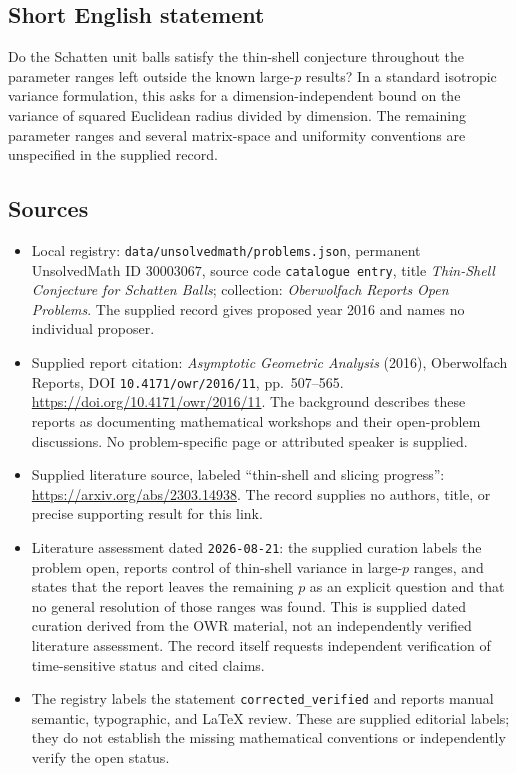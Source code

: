 \documentclass[11pt]{article}
\begin{document}
\subsection{Short English statement}
Do the Schatten unit balls satisfy the thin-shell conjecture throughout the parameter ranges left outside the known large-\(p\) results? In a standard isotropic variance formulation, this asks for a dimension-independent bound on the variance of squared Euclidean radius divided by dimension. The remaining parameter ranges and several matrix-space and uniformity conventions are unspecified in the supplied record.
\subsection{Sources}
\begin{itemize}
\item Local registry: \texttt{data/unsolvedmath/problems.json}, permanent UnsolvedMath ID \(30003067\), source code \texttt{catalogue entry}, title \emph{Thin-Shell Conjecture for Schatten Balls}; collection: \emph{Oberwolfach Reports Open Problems}. The supplied record gives proposed year 2016 and names no individual proposer.
\item Supplied report citation: \emph{Asymptotic Geometric Analysis} (2016), Oberwolfach Reports, DOI \texttt{10.4171/owr/2016/11}, pp.~507--565. \url{https://doi.org/10.4171/owr/2016/11}. The background describes these reports as documenting mathematical workshops and their open-problem discussions. No problem-specific page or attributed speaker is supplied.
\item Supplied literature source, labeled ``thin-shell and slicing progress'': \url{https://arxiv.org/abs/2303.14938}. The record supplies no authors, title, or precise supporting result for this link.
\item Literature assessment dated \texttt{2026-08-21}: the supplied curation labels the problem open, reports control of thin-shell variance in large-\(p\) ranges, and states that the report leaves the remaining \(p\) as an explicit question and that no general resolution of those ranges was found. This is supplied dated curation derived from the OWR material, not an independently verified literature assessment. The record itself requests independent verification of time-sensitive status and cited claims.
\item The registry labels the statement \texttt{corrected\_verified} and reports manual semantic, typographic, and LaTeX review. These are supplied editorial labels; they do not establish the missing mathematical conventions or independently verify the open status.
\end{itemize}
\end{document}
